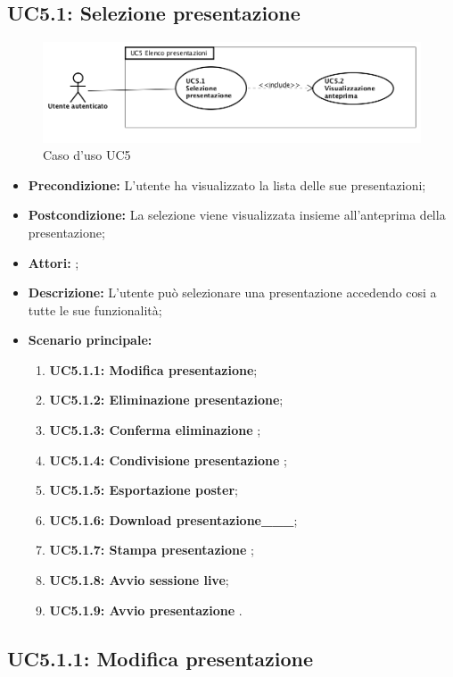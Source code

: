 \subsection{ UC5.1: Selezione presentazione}

\begin{figure}[h]
	\begin{center}
	\includegraphics[scale=0.4]{diagram/UC5.png}
	\caption{Caso d'uso UC5}
	\end{center}
\end{figure}
\begin{itemize}
	\item \textbf{Precondizione:} L'utente ha visualizzato la lista delle sue presentazioni;
	\item \textbf{Postcondizione:} La selezione viene visualizzata insieme all'anteprima della presentazione;
	\item \textbf{Attori:} ;
	\item \textbf{Descrizione:} L'utente può selezionare una presentazione accedendo cosi a tutte le sue funzionalità;
	\item \textbf{Scenario principale:}
	\begin{enumerate}
		\item \textbf{ UC5.1.1: Modifica presentazione};
		\item \textbf{ UC5.1.2: Eliminazione presentazione};
		\item \textbf{ UC5.1.3: Conferma eliminazione };
		\item \textbf{ UC5.1.4: Condivisione presentazione };
		\item \textbf{ UC5.1.5: Esportazione poster};
		\item \textbf{ UC5.1.6: Download presentazione___};
		\item \textbf{ UC5.1.7: Stampa presentazione };
		\item \textbf{ UC5.1.8: Avvio sessione live};
		\item \textbf{ UC5.1.9: Avvio presentazione }.
	\end{enumerate}
\end{itemize}
\subsection{ UC5.1.1: Modifica presentazione}


